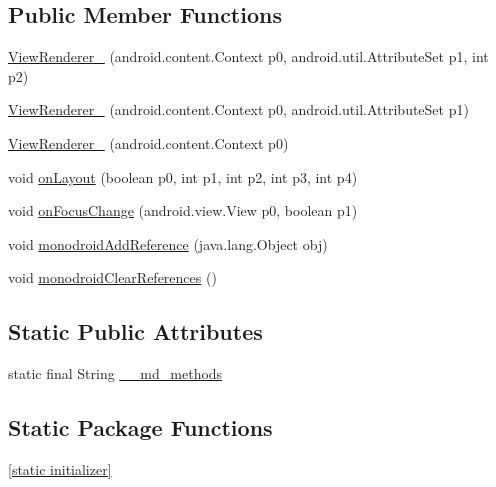 \subsection*{Public Member Functions}
\begin{CompactItemize}
\item 
\hyperlink{classmd5b60ffeb829f638581ab2bb9b1a7f4f3f_1_1_view_renderer__2_a98f61b833d11b90b0f77280606f4d3a}{ViewRenderer\_} (android.content.Context p0, android.util.AttributeSet p1, int p2)
\item 
\hyperlink{classmd5b60ffeb829f638581ab2bb9b1a7f4f3f_1_1_view_renderer__2_c966f9a1a233932f6db02bda0d1474f0}{ViewRenderer\_} (android.content.Context p0, android.util.AttributeSet p1)
\item 
\hyperlink{classmd5b60ffeb829f638581ab2bb9b1a7f4f3f_1_1_view_renderer__2_afcf92f11bfe726fa3c914d9aa18b1a4}{ViewRenderer\_} (android.content.Context p0)
\item 
void \hyperlink{classmd5b60ffeb829f638581ab2bb9b1a7f4f3f_1_1_view_renderer__2_0b758be41e41d3577cadf82bc8d004b6}{onLayout} (boolean p0, int p1, int p2, int p3, int p4)
\item 
void \hyperlink{classmd5b60ffeb829f638581ab2bb9b1a7f4f3f_1_1_view_renderer__2_44502ddde192de41caed438bc7428e96}{onFocusChange} (android.view.View p0, boolean p1)
\item 
void \hyperlink{classmd5b60ffeb829f638581ab2bb9b1a7f4f3f_1_1_view_renderer__2_64ca8244a89f60a47c173d9c0b15d610}{monodroidAddReference} (java.lang.Object obj)
\item 
void \hyperlink{classmd5b60ffeb829f638581ab2bb9b1a7f4f3f_1_1_view_renderer__2_dae20979ac761a65aa60c9b427509c37}{monodroidClearReferences} ()
\end{CompactItemize}
\subsection*{Static Public Attributes}
\begin{CompactItemize}
\item 
static final String \hyperlink{classmd5b60ffeb829f638581ab2bb9b1a7f4f3f_1_1_view_renderer__2_80b609e3e4054c380887d4dc2907a875}{\_\-\_\-md\_\-methods}
\end{CompactItemize}
\subsection*{Static Package Functions}
\begin{CompactItemize}
\item 
\hyperlink{classmd5b60ffeb829f638581ab2bb9b1a7f4f3f_1_1_view_renderer__2_a0898cf56fa9a49b653470eaf1608e77}{\mbox{[}static initializer\mbox{]}}
\end{CompactItemize}
